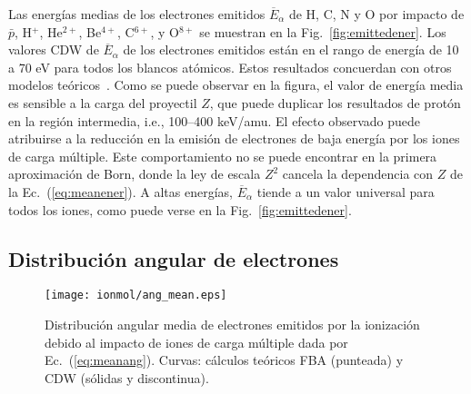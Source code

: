 Las energías medias de los electrones emitidos $\overline{E}_{\alpha}$ 
de H, C, N y O por impacto de $\bar{p}$, H$^{+}$, He$^{2+}$, Be$^{4+}$, 
C$^{6+}$, y O$^{8+}$ se muestran en la Fig.~\ref{fig:emittedener}. 
%
Los valores CDW de $\overline{E}_{\alpha}$ de los electrones emitidos 
están en el rango de energía de 10 a 70 eV para todos los blancos 
atómicos. Estos resultados concuerdan con otros modelos 
teóricos~\cite{Surdutovic:18}. Como se puede observar en la figura, el 
valor de energía media es sensible a la carga del proyectil $Z$, que 
puede duplicar los resultados de protón en la región intermedia, i.e., 
100--400 keV/amu. El efecto observado puede atribuirse a la reducción en 
la emisión de electrones de baja energía por los iones de carga múltiple. 
Este comportamiento no se puede encontrar en la primera aproximación de 
Born, donde la ley de escala $Z^2$ cancela la dependencia con $Z$ de la 
Ec.~(\ref{eq:meanener}). A altas energías, $\overline{E}_{\alpha}$ 
tiende a un valor universal para todos los iones, como puede verse en la 
Fig.~\ref{fig:emittedener}.

\subsection{Distribución angular de electrones}
\label{subsec:meanang}

\begin{figure}
\centering
\texttt{[image: ionmol/ang\_mean.eps]}
\caption[Distribución angular media de electrones emitidos.]
{Distribución angular media de electrones emitidos por la ionización 
debido al impacto de iones de carga múltiple dada por 
Ec.~(\ref{eq:meanang}). Curvas: cálculos teóricos FBA (punteada) y CDW 
(sólidas y discontinua).}
\label{fig:emittedang}
\end{figure} 

